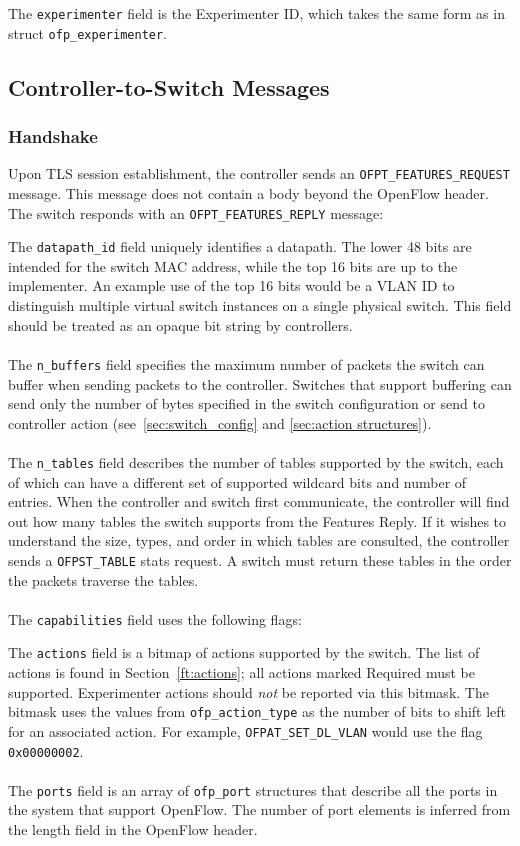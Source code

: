 
The \verb|experimenter| field is the Experimenter ID, which takes the same form as in struct \verb|ofp_experimenter|.

\subsection{Controller-to-Switch Messages}

\subsubsection{Handshake}
\label{cts:handshake} 
Upon TLS session establishment, the controller sends an \verb|OFPT_FEATURES_REQUEST| message.  This message does not contain a body beyond the OpenFlow header.  The switch responds with an \verb|OFPT_FEATURES_REPLY| message:


The \verb|datapath_id| field uniquely identifies a datapath.  The lower 48 bits are intended for the switch MAC address, while the top 16 bits are up to the implementer.  An example use of the top 16 bits would be a VLAN ID to distinguish multiple virtual switch instances on a single physical switch.  This field should be treated as an opaque bit string by controllers.
\\\\
The \verb|n_buffers| field specifies the maximum number of packets the switch can buffer when sending packets to the controller. Switches that support buffering can send only the number of bytes specified in the switch configuration or send to controller action (see~\ref{sec:switch_config} and \ref{sec:action structures}).
\\\\
The \verb|n_tables| field describes the number of tables supported by the switch, each of which can have a different set of supported wildcard bits and number of entries.  When the controller and switch first communicate, the controller will find out how many tables the switch supports from the Features Reply. If it wishes to understand the size, types, and order in which tables are consulted, the controller sends a \verb|OFPST_TABLE| stats request. A switch must return these tables in the order the packets traverse the tables.
\\\\
The \verb|capabilities| field uses the following flags:

 
The \verb|actions| field is a bitmap of actions supported by the switch.  The list of actions is found in Section~\ref{ft:actions}; all actions marked Required must be supported. Experimenter actions should \emph{not} be reported via this bitmask. The bitmask uses the values from \verb|ofp_action_type| as the number of bits to shift left for an associated action. For example, \verb|OFPAT_SET_DL_VLAN| would use the flag \verb|0x00000002|.
\\\\
The \verb|ports| field is an array of \verb|ofp_port| structures that describe all the ports in the system that support OpenFlow.  The number of port elements is inferred from the length field in the OpenFlow header. 

